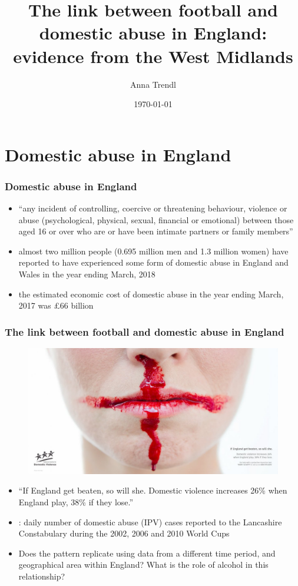 \documentclass[hyperref={pdfpagelabels=false}]{beamer}
\title{The link between football and domestic abuse in England: evidence from the West Midlands}
\author{Anna Trendl}
\date{\today}
\begin{document}
\begin{frame}
\titlepage
\end{frame} 


\section{Domestic abuse in England} 
\begin{frame}
\frametitle{Domestic abuse in England} 
\begin{itemize}
\item ``any incident of controlling, coercive or threatening behaviour, violence or abuse (psychological, physical, sexual, financial or emotional) between those aged 16 or over who are or have been intimate partners or family members'' \cite{cps}
\item almost two million people (0.695 million men and 1.3 million women) have reported to have experienced some form of domestic abuse in England and Wales in the year ending March, 2018 \cite{ONS}
\item the estimated economic cost of domestic abuse in the year ending March, 2017 was \pounds 66 billion \cite{costs}
\end{itemize}
\end{frame}



\begin{frame}
\frametitle{The link between football and domestic abuse in England}
\begin{center}
\begin{figure}
\includegraphics[scale=0.15]{domesticviolence.jpg}
\end{figure}
\end{center}
\begin{itemize}
\item ``If England get beaten, so will she. Domestic violence increases 26\% when England play, 38\% if they lose.''

\item {}: daily number of domestic abuse (IPV) cases reported to the Lancashire Constabulary during the 2002, 2006 and 2010 World Cups 
\item Does the pattern replicate using data from a different time period, and geographical area within England? What is the role of alcohol in this relationship?
\end{itemize}
\end{frame}
\end{document}
